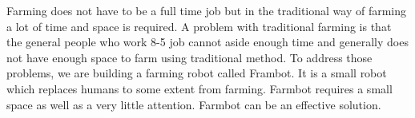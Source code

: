 Farming does not have to be a full time job but in the traditional way of farming a lot of time and space is required. A problem with traditional farming is that the general people who work 8-5 job cannot aside enough time and generally does not have enough space to farm using traditional method. To address those problems, we are building a farming robot called Frambot. It is a small robot which replaces humans to some extent from farming. Farmbot requires a small space as well as a very little attention. Farmbot can be an effective solution.